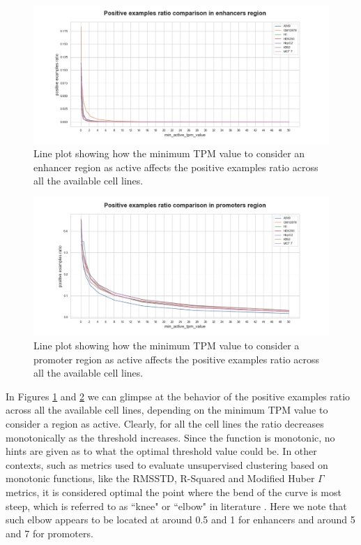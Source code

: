 \documentclass{article}
\begin{document}
\begin{figure}
    \centering
    \includegraphics[width=\textwidth]{img/lineplot_enhancers.png}
    \caption{Line plot showing how the minimum TPM value to consider an enhancer region as active affects the positive examples ratio across all the available cell lines.}
    \label{fig:exp:lineplot_enh}
\end{figure}

\begin{figure}
    \centering
    \includegraphics[width=\textwidth]{img/lineplot_promoters.png}
    \caption{Line plot showing how the minimum TPM value to consider a promoter region as active affects the positive examples ratio across all the available cell lines.}
    \label{fig:exp:lineplot_prom}
\end{figure}

In Figures \ref{fig:exp:lineplot_enh} and \ref{fig:exp:lineplot_prom} we can glimpse at the behavior of the positive examples ratio across all the available cell lines, depending on the minimum TPM value to consider a region as active. Clearly, for all the cell lines the ratio decreases monotonically as the threshold increases. Since the function is monotonic, no hints are given as to what the optimal threshold value could be. In other contexts, such as metrics used to evaluate unsupervised clustering based on monotonic functions, like the RMSSTD, R-Squared and Modified Huber $\Gamma$ metrics, it is considered optimal the point where the bend of the curve is most steep, which is referred to as  “knee" or  “elbow" in literature \cite{halkidi01, liu13}. Here we note that such elbow appears to be located at around 0.5 and 1 for enhancers and around 5 and 7 for promoters.
\end{document}
